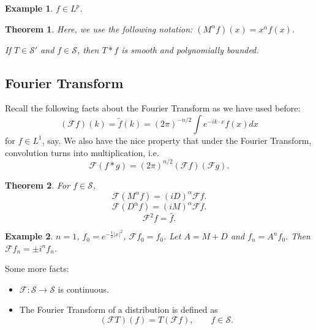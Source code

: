 \documentclass[letterpaper,twoside,11pt]{article}
\theoremstyle{mystyle}
\newtheorem{theorem}{Theorem}[section]
\newtheorem*{ex}{Example}
\newcommand{\ScS}{\mathcal S}
\begin{document}
\begin{ex}
  $f \in L^p$.
\end{ex}
\begin{tcolorbox}[colback=red!5!white,colframe=red!75!black]
\begin{theorem}
  Here, we use the following notation: $\left( {{M^\alpha }f} \right)\left( x \right) = {x^\alpha }f\left( x \right)$.
  
  If $T\in \ScS'$ and $f \in \ScS$, then $T\ast f$ is smooth and polynomially bounded. 
\end{theorem}
\end{tcolorbox}


\subsection{Fourier Transform}

Recall the following facts about the Fourier Transform as we have used before: 
\[\left( {\mathcal{F}f} \right)\left( k \right) = \tilde f\left( k \right) = {\left( {2\pi } \right)^{ - n/2}}\int {e^{ - ik \cdot x}}f\left( x \right)dx\]
for $f \in L^1$, say. We also have the nice property that under the Fourier Transform, convolution turns into multiplication, i.e. 
\[\mathcal{F}\left( {f * g} \right) = {\left( {2\pi } \right)^{n/2}}\left( {\mathcal{F}f} \right)\left( {\mathcal{F}g} \right).\]


\begin{tcolorbox}[colback=red!5!white,colframe=red!75!black]
  \begin{theorem}
    For $f \in \ScS$, 
    \[\mathcal{F}\left( {{M^\alpha }f} \right) = {\left( {iD} \right)^\alpha }\mathcal{F}f.\]
    \[\mathcal{F}\left( {{D^\alpha }f} \right) = {\left( {iM} \right)^\alpha }\mathcal{F}f.\]
    \[\mathcal{F}^2f = \hat f.\]


  \end{theorem}
\end{tcolorbox}

\begin{ex}
  $n = 1$, $f_0 = e^{-\frac{1}{2}|x|^2}$, $\mathcal F f_0 = f_0$. Let $A = M + D$ and $f_n = A^n f_0$. Then $\mathcal F f_n = \pm i^n f_n$. 
\end{ex}

Some more facts: 
\begin{itemize}
  \item $\mathcal F: \ScS \to \ScS$ is continuous. 
  \item The Fourier Transform of a distribution is defined as 
  \[\left( {\mathcal{F}T} \right)\left( f \right) = T\left( {\mathcal{F}f} \right), \qquad f \in \ScS.\]
\end{itemize}
\end{document}
